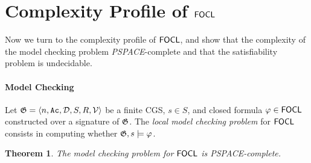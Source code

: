 \documentclass{article}
\newtheorem{theorem}{Theorem}
\begin{document}
    




\section{Complexity Profile of $\mathsf{FOCL}$}

\label{sec:mc}
Now we turn to the complexity profile of $\mathsf{FOCL}$, and show that %
the complexity of the model checking problem \textit{PSPACE}-complete and that the satisfiability problem is undecidable.

\paragraph*{Model Checking}
    Let $\mathfrak{G} = \langle n,\texttt{Ac}, \mathcal{D}, S,R, \mathcal{V}  \rangle$ be a finite CGS, $s \in S$, and closed formula $\varphi \in \mathsf{FOCL}$ constructed over a signature of $\mathfrak{G}$. The \emph{local model checking problem} for $\mathsf{FOCL}$ consists in computing whether $\mathfrak{G}, s \models \varphi$.

\begin{theorem}
\label{thm:model_checking}
    The model checking problem for $\mathsf{FOCL}$ is PSPACE-complete.
\end{theorem}
\end{document}
